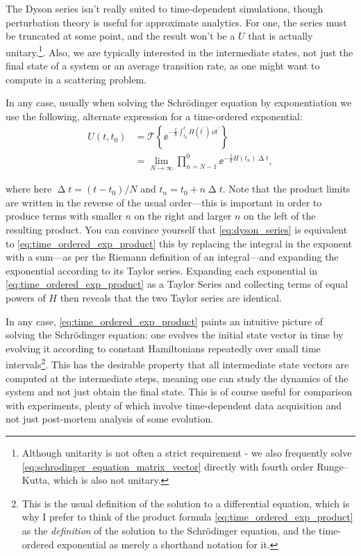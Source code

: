 The Dyson series isn't really suited to time-dependent simulations, though perturbation theory is useful for approximate analytics. For one, the series must be truncated at some point, and the result won't be a $U$ that is actually unitary.\footnote{Although unitarity is not often a strict requirement - we also frequently solve \eqref{eq:schrodinger_equation_matrix_vector} directly with fourth order Runge--Kutta, which is also not unitary.}. Also, we are typically interested in the intermediate states, not just the final state of a system or an average transition rate, as one might want to compute in a scattering problem.

In any case, usually when solving the Schr\"odinger equation by exponentiation we use the following, alternate expression for a time-ordered exponential:
\begin{align}
U(t, t_0) &= \mathcal{T}\left\{\ee^{-\frac \ii \hbar \int_{t_0}^t H(t^\prime)\,\dd t^\prime}\right\}\\
 &= \lim_{N\rightarrow\infty}\prod_{n=N-1}^0 \ee^{-\frac \ii \hbar  H(t_n)\upDelta t},
\label{eq:time_ordered_exp_product}
\end{align}

where here $\upDelta t = (t - t_0)/N$ and $t_n = t_0 + n\upDelta t$. Note that the product limits are written in the reverse of the usual order---this is important in order to produce terms with smaller $n$ on the right and larger $n$ on the left of the resulting product. You can convince yourself that \eqref{eq:dyson_series} is equivalent to \eqref{eq:time_ordered_exp_product} this by replacing the integral in the exponent with a sum---as per the Riemann definition of an integral---and expanding the exponential according to its Taylor series. Expanding each exponential in \eqref{eq:time_ordered_exp_product} as a Taylor Series and collecting terms of equal powers of $H$ then reveals that the two Taylor series are identical.

In any case, \eqref{eq:time_ordered_exp_product} paints an intuitive picture of solving the Schr\"odinger equation: one evolves the initial state vector in time by evolving it according to constant Hamiltonians repeatedly over small time intervals\footnote{This is the usual definition of the solution to a differential equation, which is why I prefer to think of the product formula \eqref{eq:time_ordered_exp_product} as the \emph{definition} of the solution to the Schr\"odinger equation, and the time-ordered exponential as merely a shorthand notation for it.}. This has the desirable property that all intermediate state vectors are computed at the intermediate steps, meaning one can study the dynamics of the system and not just obtain the final state. This is of course useful for comparison with experiments, plenty of which involve time-dependent data acquisition and not just post-mortem analysis of some evolution.

